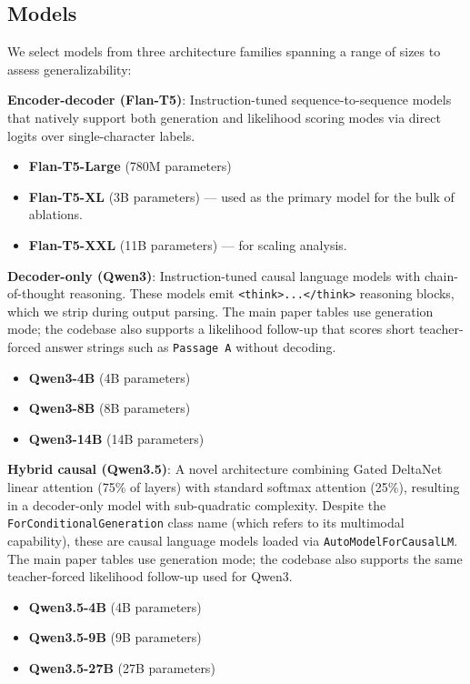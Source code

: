 \subsection{Models}

We select models from three architecture families spanning a range of sizes to assess generalizability:

\textbf{Encoder-decoder (Flan-T5)}: Instruction-tuned sequence-to-sequence models that natively support both generation and likelihood scoring modes via direct logits over single-character labels.
\begin{itemize}[leftmargin=*]
\item \textbf{Flan-T5-Large} (780M parameters)
\item \textbf{Flan-T5-XL} (3B parameters) --- used as the primary model for the bulk of ablations.
\item \textbf{Flan-T5-XXL} (11B parameters) --- for scaling analysis.
\end{itemize}

\textbf{Decoder-only (Qwen3)}: Instruction-tuned causal language models with chain-of-thought reasoning. These models emit \texttt{<think>...</think>} reasoning blocks, which we strip during output parsing. The main paper tables use generation mode; the codebase also supports a likelihood follow-up that scores short teacher-forced answer strings such as \texttt{Passage A} without decoding.
\begin{itemize}[leftmargin=*]
\item \textbf{Qwen3-4B} (4B parameters)
\item \textbf{Qwen3-8B} (8B parameters)
\item \textbf{Qwen3-14B} (14B parameters)
\end{itemize}

\textbf{Hybrid causal (Qwen3.5)}: A novel architecture combining Gated DeltaNet linear attention (75\% of layers) with standard softmax attention (25\%), resulting in a decoder-only model with sub-quadratic complexity. Despite the \texttt{ForConditionalGeneration} class name (which refers to its multimodal capability), these are causal language models loaded via \texttt{AutoModelForCausalLM}. The main paper tables use generation mode; the codebase also supports the same teacher-forced likelihood follow-up used for Qwen3.
\begin{itemize}[leftmargin=*]
\item \textbf{Qwen3.5-4B} (4B parameters)
\item \textbf{Qwen3.5-9B} (9B parameters)
\item \textbf{Qwen3.5-27B} (27B parameters)
\end{itemize}

